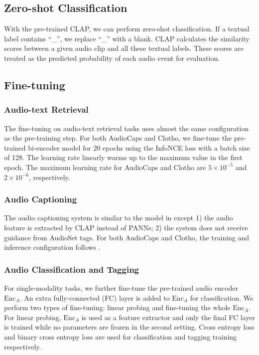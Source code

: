 \documentclass[sigconf,anonymous,review]{acmart}
\begin{document}
\subsection{Zero-shot Classification}
With the pre-trained CLAP, we can perform zero-shot classification.
If a textual label contains ``\_'', we replace ``\_'' with a blank.
CLAP calculates the similarity scores between a given audio clip and all these textual labels.
These scores are treated as the predicted probability of each audio event for evaluation.

\subsection{Fine-tuning}

\subsubsection{Audio-text Retrieval}
The fine-tuning on audio-text retrieval tasks uses almost the same configuration as the pre-training step.
For both AudioCaps and Clotho, we fine-tune the pre-trained bi-encoder model for 20 epochs using the InfoNCE loss with a batch size of 128.
The learning rate linearly warms up to the maximum value in the first epoch.
The maximum learning rate for AudioCaps and Clotho are $5\times10^{-5}$ and $2\times10^{-6}$, respectively.

\subsubsection{Audio Captioning}
The audio captioning system is similar to the model in  except 1) the audio feature is extracted by CLAP instead of PANNs; 2) the system does not receive guidance from AudioSet tags.
For both AudioCaps and Clotho, the training and inference configuration follows .


\subsubsection{Audio Classification and Tagging}
For single-modality tasks, we further fine-tune the pre-trained audio encoder $\text{Enc}_A$.
An extra fully-connected (FC) layer is added to $\text{Enc}_A$ for classification.
We perform two types of fine-tuning: linear probing and fine-tuning the whole $\text{Enc}_A$.
For linear probing, $\text{Enc}_A$ is used as a feature extractor and only the final FC layer is trained while no parameters are frozen in the second setting.
Cross entropy loss and binary cross entropy loss are used for classification and tagging training respectively.
\end{document}
